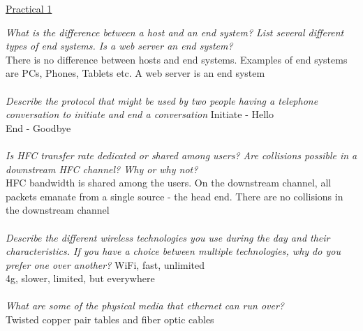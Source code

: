 \documentclass{article}[18pt]
\begin{document}
\begin{center}
\underline{\huge Practical 1}
\end{center}
\textit{What is the difference between a host and an end system? List several different types of end systems. Is a web server an end system?}\\
There is no difference between hosts and end systems. Examples of end systems are PCs, Phones, Tablets etc. A web server is an end system\\
\\
\textit{Describe the protocol that might be used by two people having a telephone conversation to initiate and end a conversation}
Initiate - Hello\\
End - Goodbye\\
\\
\textit{Is HFC transfer rate dedicated or shared among users? Are collisions possible in a downstream HFC channel? Why or why not?}\\
HFC bandwidth is shared among the users. On the downstream channel, all packets emanate from a single source - the head end. There are no collisions in the downstream channel\\
\\
\textit{Describe the different wireless technologies you use during the day and their characteristics. If you have a choice between multiple technologies, why do you prefer one over another?}
WiFi, fast, unlimited\\
4g, slower, limited, but everywhere\\
\\
\textit{What are some of the physical media that ethernet can run over?}\\
Twisted copper pair tables and fiber optic cables
\end{document}
